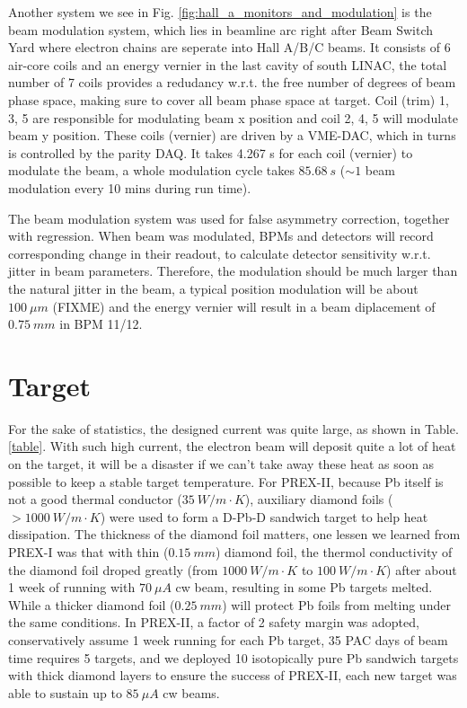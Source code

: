 Another system we see in Fig. \ref{fig:hall_a_monitors_and_modulation} is the
beam modulation system, which lies in beamline arc right after Beam Switch Yard 
where electron chains are seperate into Hall A/B/C beams.
It consists of 6 air-core coils and an energy vernier in the last cavity of south LINAC, 
the total number of 7 coils provides a redudancy w.r.t. the free number of degrees 
of beam phase space, making sure to cover all beam phase space at target.  
Coil (trim) 1, 3, 5 are responsible for modulating beam x position and coil 
2, 4, 5 will modulate beam y position.
These coils (vernier) are driven by a VME-DAC, which in turns is controlled by the parity DAQ.
It takes 4.267 s for each coil (vernier) to modulate the beam, a whole 
modulation cycle takes $85.68 \ s$ ($\sim 1$ beam modulation every 10 mins during
run time). 

The beam modulation system was used for false asymmetry correction, together with
regression. When beam was modulated, BPMs and detectors will record corresponding
change in their readout, to calculate detector sensitivity w.r.t. jitter in beam
parameters. Therefore, the modulation should be much larger than the natural
jitter in the beam, a typical position modulation will be about $100\ \mu m$ (FIXME)
and the energy vernier will result in a beam diplacement of $0.75 \ mm$ in BPM 11/12.

\section{Target}
For the sake of statistics, the designed current was quite large, as shown in
Table. \ref{table}. With such high current, the electron beam will deposit quite
a lot of heat on the target, it will be a disaster if we can't take away these
heat as soon as possible to keep a stable target temperature.
For PREX-II, because Pb itself is not a good thermal conductor ($35\ W/m\cdot K$),
auxiliary diamond foils ($> 1000\ W/m\cdot K$) were used to form a D-Pb-D sandwich target to help heat
dissipation. The thickness of the diamond foil matters, one lessen we learned 
from PREX-I was that with thin ($0.15\ mm$) diamond foil, the thermol conductivity
of the diamond foil droped greatly (from $1000 \ W/m \cdot K$ to $100 \ W/m\cdot K$) after about 
1 week of running with $70\ \mu A$ cw beam, resulting in some Pb targets melted. 
While a thicker diamond foil ($0.25\ mm$) will protect Pb foils from melting 
under the same conditions. In PREX-II, a factor of 2 safety margin was
adopted, conservatively assume 1 week running for each Pb target, 35 PAC days of beam time
requires 5 targets, and we deployed 10 isotopically pure Pb sandwich targets with 
thick diamond layers to ensure the success of PREX-II, each new target was able
to sustain up to $85\ \mu A$ cw beams.

